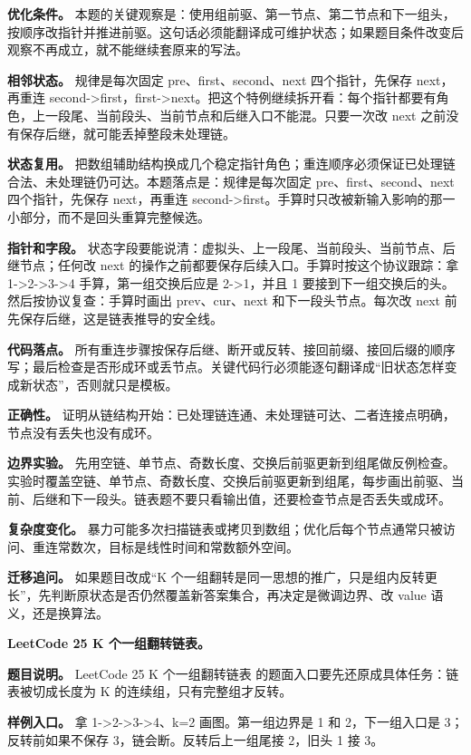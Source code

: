 \textbf{优化条件。} 本题的关键观察是：使用组前驱、第一节点、第二节点和下一组头，按顺序改指针并推进前驱。这句话必须能翻译成可维护状态；如果题目条件改变后观察不再成立，就不能继续套原来的写法。

\textbf{相邻状态。} 规律是每次固定 pre、first、second、next 四个指针，先保存 next，再重连 second->first，first->next。把这个特例继续拆开看：每个指针都要有角色，上一段尾、当前段头、当前节点和后继入口不能混。只要一次改 next 之前没有保存后继，就可能丢掉整段未处理链。

\textbf{状态复用。} 把数组辅助结构换成几个稳定指针角色；重连顺序必须保证已处理链合法、未处理链仍可达。本题落点是：规律是每次固定 pre、first、second、next 四个指针，先保存 next，再重连 second->first。手算时只改被新输入影响的那一小部分，而不是回头重算完整候选。

\textbf{指针和字段。} 状态字段要能说清：虚拟头、上一段尾、当前段头、当前节点、后继节点；任何改 next 的操作之前都要保存后续入口。手算时按这个协议跟踪：拿 1->2->3->4 手算，第一组交换后应是 2->1，并且 1 要接到下一组交换后的头。然后按协议复查：手算时画出 prev、cur、next 和下一段头节点。每次改 next 前先保存后继，这是链表推导的安全线。

\textbf{代码落点。} 所有重连步骤按保存后继、断开或反转、接回前缀、接回后缀的顺序写；最后检查是否形成环或丢节点。关键代码行必须能逐句翻译成“旧状态怎样变成新状态”，否则就只是模板。

\textbf{正确性。} 证明从链结构开始：已处理链连通、未处理链可达、二者连接点明确，节点没有丢失也没有成环。

\textbf{边界实验。} 先用空链、单节点、奇数长度、交换后前驱更新到组尾做反例检查。实验时覆盖空链、单节点、奇数长度、交换后前驱更新到组尾，每步画出前驱、当前、后继和下一段头。链表题不要只看输出值，还要检查节点是否丢失或成环。

\textbf{复杂度变化。} 暴力可能多次扫描链表或拷贝到数组；优化后每个节点通常只被访问、重连常数次，目标是线性时间和常数额外空间。

\textbf{迁移追问。} 如果题目改成“K 个一组翻转是同一思想的推广，只是组内反转更长”，先判断原状态是否仍然覆盖新答案集合，再决定是微调边界、改 value 语义，还是换算法。

\noindent\textbf{LeetCode 25 K 个一组翻转链表。}

\textbf{题目说明。} LeetCode 25 K 个一组翻转链表 的题面入口要先还原成具体任务：链表被切成长度为 K 的连续组，只有完整组才反转。

\textbf{样例入口。} 拿 1->2->3->4、k=2 画图。第一组边界是 1 和 2，下一组入口是 3；反转前如果不保存 3，链会断。反转后上一组尾接 2，旧头 1 接 3。

